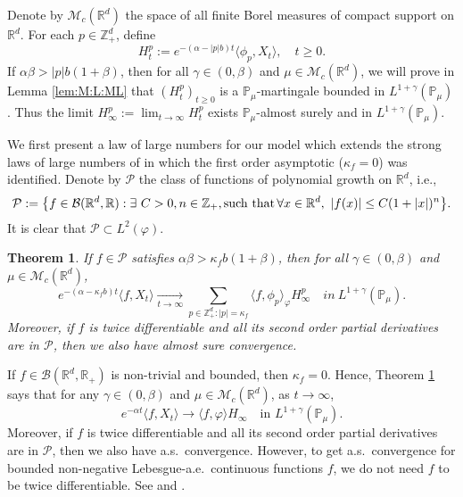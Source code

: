 \documentclass[12pt,a4paper]{amsart}
\theoremstyle{plain}
\newtheorem{thm}{Theorem}[section]
\theoremstyle{definition}
\numberwithin{equation}{section}
\begin{document}
  Denote by $\mathcal M_c(\mathbb R^d)$ the space of all finite Borel measures of compact support on $\mathbb R^d$.
  For each $p\in \mathbb{Z}_+^d$, define
  \[
    H_t^p
    := e^{-(\alpha-|p|b)t}\langle\phi_p,X_t\rangle,
    \quad t\geq 0.
  \]
  If $\alpha\beta>|p|b(1+\beta)$, then for all $\gamma\in (0, \beta)$ and $\mu\in \mathcal M_c(\mathbb R^d)$, we will prove in Lemma \ref{lem:M:L:ML} that $(H_t^p)_{t\geq 0}$ is a $\mathbb{P}_{\mu}$-martingale bounded in $L^{1+\gamma}(\mathbb{P}_{\mu})$.
  Thus the limit $H^p_{\infty}:=\lim_{t\rightarrow \infty}H_t^p$ exists $\mathbb{P}_{\mu}$-almost surely and in $L^{1+\gamma}(\mathbb{P}_{\mu})$.

We first present a law of large numbers for our model which extends the strong laws of large numbers of \cite{ChenRenYang2019Skeleton, EckhoffKyprianouWinkel2015Spines} in which the first order asymptotic ($\kappa_f=0$) was identified.
Denote by $\mathcal P$ the class of functions of polynomial growth on $\mathbb R^d$, i.e.,
\begin{equation}
  \label{eq: polynomial growth function}
  \mathcal{P}
  :=\big \{f\in \mathcal B(\mathbb R^d, \mathbb R):\exists~ C>0, n \in \mathbb Z_+, {\rm such  \, \, that \, } \forall x\in \mathbb R^d,~ |f(x)|\leq C(1+|x|)^n\big\}.
\end{equation}
It is clear that $\mathcal{P} \subset L^2(\varphi)$.
\begin{thm}
  \label{thm: law of large number}
  If $f \in \mathcal{P}$ satisfies $\alpha\beta>\kappa_fb(1+\beta)$, then for all $\gamma\in (0, \beta)$ and  $\mu\in \mathcal M_c(\mathbb R^d)$,
  \[
    e^{-(\alpha-\kappa_fb)t}\langle f, X_t\rangle
    \xrightarrow[t\to \infty]{}\sum_{p\in \mathbb Z_+^d:|p|=\kappa_f}\langle f, \phi_p\rangle_{\varphi} H_{\infty}^p
    \quad in~ L^{1+\gamma}(\mathbb{P}_{\mu}).
  \]
  Moreover, if $f$ is twice differentiable and all its second order partial derivatives are in $\mathcal{P}$, then we also have almost sure convergence.
\end{thm}
If $f\in \mathcal B(\mathbb R^d, \mathbb R_+)$ is non-trivial and  bounded, then $\kappa_f=0$.
Hence, Theorem \ref{thm: law of large number} says that for any $\gamma\in (0, \beta)$ and  $\mu\in \mathcal M_c(\mathbb R^d)$, as $t\rightarrow \infty$,
\[
  e^{-\alpha t}\langle f, X_t\rangle
  \rightarrow \langle f, \varphi\rangle H_{\infty}
  \quad \mbox{in } L^{1+\gamma}(\mathbb{P}_{\mu}).
\]
Moreover, if $f$ is twice differentiable and all its second order partial derivatives are in $\mathcal{P}$, then we also have a.\/s.\ convergence.
However, to get  a.\/s.\ convergence for bounded non-negative
Lebesgue-a.\/e.\/\ continuous functions $f$, we do not need $f$ to be twice differentiable. See \cite[Theorem 2.13 \& Example 8.1]{ChenRenYang2019Skeleton} and \cite[Theorem 1.2 \& Example 4.1]{EckhoffKyprianouWinkel2015Spines}.
\end{document}
